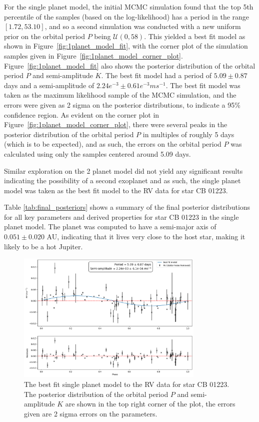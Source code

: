 For the single planet model, the initial MCMC simulation found that the top 5th percentile of the samples (based on the
log-likelihood) has a period in the range $[1.72, 53.10]$, and so a second simulation was conducted with a new uniform
prior on the orbital period $P$ being $\mathcal{U}(0, 58)$.
This yielded a best fit model as shown in Figure~\eqref{fig:1planet_model_fit}, with the corner plot of the simulation
samples given in Figure~\eqref{fig:1planet_model_corner_plot}.
Figure~\eqref{fig:1planet_model_fit} also shows the posterior distribution of the orbital period $P$ and semi-amplitude $K$.
The best fit model had a period of $5.09 \pm 0.87$ days and a semi-amplitude of $2.24e^{-3} \pm 0.61e^{-3} ms^{-1}$.
The best fit model was taken as the maximum likelihood sample of the MCMC simulation, and the errors were given
as 2 sigma on the posterior distributions, to indicate a 95\% confidence region.
As evident on the corner plot in Figure~\eqref{fig:1planet_model_corner_plot}, there were several peaks in the posterior
distribution of the orbital period $P$ in multiples of roughly 5 days (which is to be expected), and as such, the
errors on the orbital period $P$ was calculated using only the samples centered around 5.09 days.

Similar exploration on the 2 planet model did not yield any significant results indicating the possibility of a second
exoplanet and as such, the single planet model was taken as the best fit model to the RV data for star CB 01223.

Table \eqref{tab:final_posteriors} shows a summary of the final posterior distributions for all key parameters and derived
properties for star CB 01223 in the single planet model.
The planet was computed to have a semi-major axis of $0.051 \pm 0.020$ AU, indicating that it lives very close to the host star,
making it likely to be a hot Jupiter.

\begin{figure}[htb]
    \centering
    \includegraphics[width=0.8\textwidth]{figures/1planet_model_fit}
    \caption{The best fit single planet model to the RV data for star CB 01223.
    The posterior distribution of the orbital period $P$ and semi-amplitude $K$ are shown in the top right corner of the plot,
    the errors given are 2 sigma errors on the parameters.}
    \label{fig:1planet_model_fit}
\end{figure}

